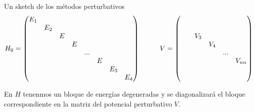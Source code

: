 \documentclass[10pt,oneside]{CBFT_book}
\begin{document}
Un sketch de los métodos perturbativos
\[
	H_0 = \begin{pmatrix}
	       E_1 & \\
	       & E_2 & \\
	       & & E \\
	       & & & E\\
	       & & & & ...\\
	       & & & & & E\\
	       & & & & & & E_3\\
	       & & & & & & & E_4
	      \end{pmatrix}
	      \hspace*{10mm}
	      V =
		\begin{pmatrix}
		& \\
		& \\
		& & V_3 \\
		& & & V_4 \\
		& & & & ... \\
		& & & & & V_{nn} \\
		& \\
		& 
		\end{pmatrix}
\]

En $H$ tenenmos un bloque de energías degeneradas y se diagonalizará el bloque 
correspondiente en la matriz del potencial perturbativo $V$.




\end{document}
